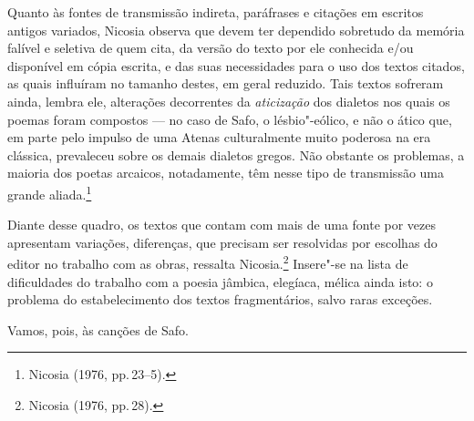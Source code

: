 Quanto às fontes de transmissão indireta, paráfrases e citações em escritos
antigos variados, Nicosia observa que devem ter dependido
sobretudo da memória falível e seletiva de quem cita, da versão do texto por
ele conhecida e/ou disponível em cópia escrita, e das suas necessidades para o
uso dos textos citados, as quais influíram no tamanho destes, em geral
reduzido. Tais textos sofreram ainda, lembra ele, alterações decorrentes da
\emph{aticização} dos dialetos nos quais os poemas foram compostos --- no caso de Safo,
o lésbio"-eólico, e não o ático que, em parte pelo impulso de uma Atenas
culturalmente muito poderosa na era clássica, prevaleceu sobre os demais
dialetos gregos. Não obstante os problemas, a maioria dos poetas
arcaicos, notadamente, têm nesse tipo de transmissão uma grande aliada.\footnote{ Nicosia (1976, pp.\,23--5).}

Diante desse quadro, os textos que contam com mais de uma fonte por vezes
apresentam variações, diferenças, que precisam ser resolvidas por escolhas do
editor no trabalho com as obras, ressalta Nicosia.\footnote{ Nicosia (1976, pp.\,28).} Insere"-se na lista
de dificuldades do trabalho com a poesia jâmbica, elegíaca, mélica
ainda isto: o problema do estabelecimento dos textos fragmentários, salvo raras
exceções. 

Vamos, pois, às canções de Safo.

